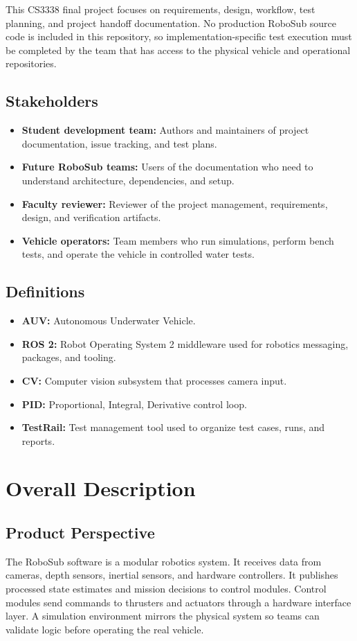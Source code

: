 \documentclass[12pt]{article}
\begin{document}
This CS3338 final project focuses on requirements, design, workflow, test planning, and project handoff documentation. No production RoboSub source code is included in this repository, so implementation-specific test execution must be completed by the team that has access to the physical vehicle and operational repositories.

\subsection{Stakeholders}
\begin{itemize}[leftmargin=*]
  \item \textbf{Student development team:} Authors and maintainers of project documentation, issue tracking, and test plans.
  \item \textbf{Future RoboSub teams:} Users of the documentation who need to understand architecture, dependencies, and setup.
  \item \textbf{Faculty reviewer:} Reviewer of the project management, requirements, design, and verification artifacts.
  \item \textbf{Vehicle operators:} Team members who run simulations, perform bench tests, and operate the vehicle in controlled water tests.
\end{itemize}

\subsection{Definitions}
\begin{itemize}[leftmargin=*]
  \item \textbf{AUV:} Autonomous Underwater Vehicle.
  \item \textbf{ROS 2:} Robot Operating System 2 middleware used for robotics messaging, packages, and tooling.
  \item \textbf{CV:} Computer vision subsystem that processes camera input.
  \item \textbf{PID:} Proportional, Integral, Derivative control loop.
  \item \textbf{TestRail:} Test management tool used to organize test cases, runs, and reports.
\end{itemize}

\section{Overall Description}
\subsection{Product Perspective}
The RoboSub software is a modular robotics system. It receives data from cameras, depth sensors, inertial sensors, and hardware controllers. It publishes processed state estimates and mission decisions to control modules. Control modules send commands to thrusters and actuators through a hardware interface layer. A simulation environment mirrors the physical system so teams can validate logic before operating the real vehicle.
\end{document}
